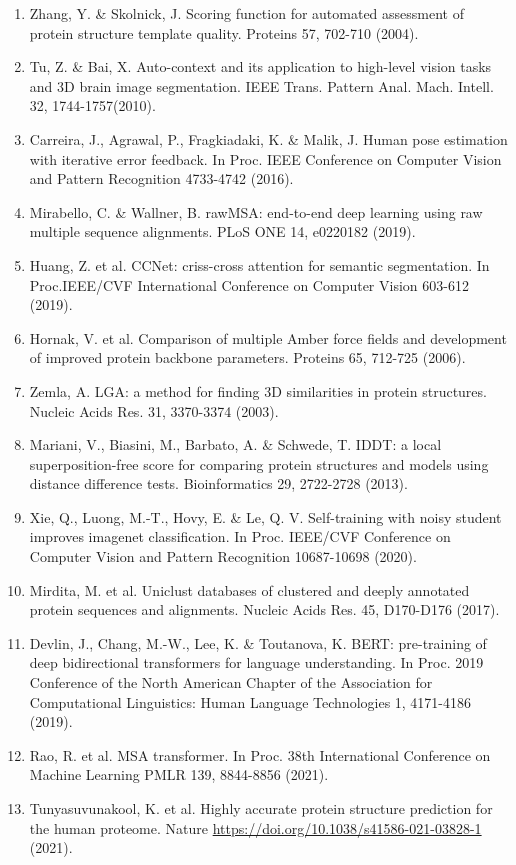 \documentclass[10pt]{article}
\begin{document}
\begin{enumerate}
  \item Zhang, Y. \& Skolnick, J. Scoring function for automated assessment of protein structure template quality. Proteins 57, 702-710 (2004).
  \item Tu, Z. \& Bai, X. Auto-context and its application to high-level vision tasks and 3D brain image segmentation. IEEE Trans. Pattern Anal. Mach. Intell. 32, 1744-1757(2010).
  \item Carreira, J., Agrawal, P., Fragkiadaki, K. \& Malik, J. Human pose estimation with iterative error feedback. In Proc. IEEE Conference on Computer Vision and Pattern Recognition 4733-4742 (2016).
  \item Mirabello, C. \& Wallner, B. rawMSA: end-to-end deep learning using raw multiple sequence alignments. PLoS ONE 14, e0220182 (2019).
  \item Huang, Z. et al. CCNet: criss-cross attention for semantic segmentation. In Proc.IEEE/CVF International Conference on Computer Vision 603-612 (2019).
  \item Hornak, V. et al. Comparison of multiple Amber force fields and development of improved protein backbone parameters. Proteins 65, 712-725 (2006).
  \item Zemla, A. LGA: a method for finding 3D similarities in protein structures. Nucleic Acids Res. 31, 3370-3374 (2003).
  \item Mariani, V., Biasini, M., Barbato, A. \& Schwede, T. IDDT: a local superposition-free score for comparing protein structures and models using distance difference tests. Bioinformatics 29, 2722-2728 (2013).
  \item Xie, Q., Luong, M.-T., Hovy, E. \& Le, Q. V. Self-training with noisy student improves imagenet classification. In Proc. IEEE/CVF Conference on Computer Vision and Pattern Recognition 10687-10698 (2020).
  \item Mirdita, M. et al. Uniclust databases of clustered and deeply annotated protein sequences and alignments. Nucleic Acids Res. 45, D170-D176 (2017).
  \item Devlin, J., Chang, M.-W., Lee, K. \& Toutanova, K. BERT: pre-training of deep bidirectional transformers for language understanding. In Proc. 2019 Conference of the North American Chapter of the Association for Computational Linguistics: Human Language Technologies 1, 4171-4186 (2019).
  \item Rao, R. et al. MSA transformer. In Proc. 38th International Conference on Machine Learning PMLR 139, 8844-8856 (2021).
  \item Tunyasuvunakool, K. et al. Highly accurate protein structure prediction for the human proteome. Nature \href{https://doi.org/10.1038/s41586-021-03828-1}{https://doi.org/10.1038/s41586-021-03828-1} (2021).

\end{enumerate}
\end{document}
